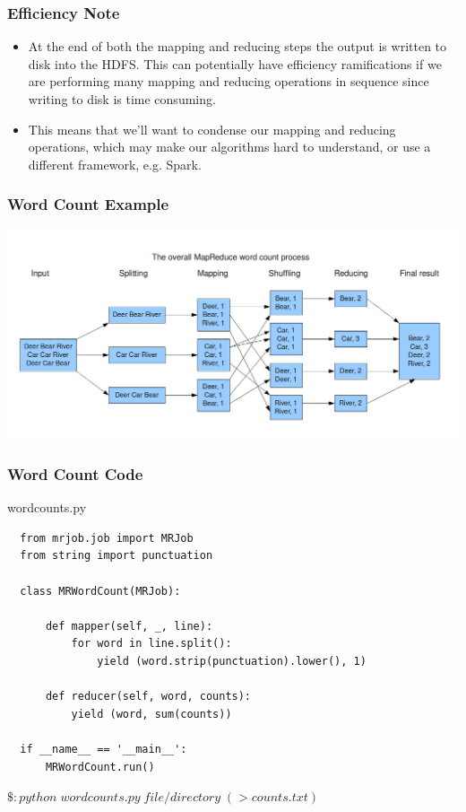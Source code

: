 \documentclass{beamer}
\begin{document}
\begin{frame}
  \frametitle{Efficiency Note}
  \begin{itemize}
    \item At the end of both the mapping and reducing steps the output is written to disk into the HDFS. This can potentially have efficiency ramifications if we are performing many mapping and reducing operations in sequence since writing to disk is time consuming.
    \item This means that we'll want to condense our mapping and reducing operations, which may make our algorithms hard to understand, or use a different framework, e.g. Spark.
  \end{itemize}
\end{frame}

\begin{frame}
  \frametitle{Word Count Example}
  \includegraphics[width=\textwidth]{../images/word_count.png}
\end{frame}

\begin{frame}[fragile]
  \frametitle{Word Count Code}
  wordcounts.py
  \begin{lstlisting}
  from mrjob.job import MRJob
  from string import punctuation

  class MRWordCount(MRJob):
    
      def mapper(self, _, line):
          for word in line.split():
              yield (word.strip(punctuation).lower(), 1)

      def reducer(self, word, counts):
          yield (word, sum(counts))

  if __name__ == '__main__':
      MRWordCount.run()
  \end{lstlisting}

  $\$ : python \;  wordcounts.py \; file/directory \; (> counts.txt) $
\end{frame}
\end{document}
